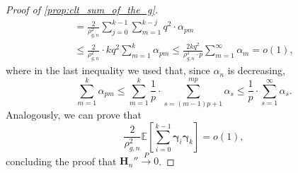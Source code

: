 \documentclass[11pt,a4paper,oneside]{article}
\theoremstyle{definition}
\theoremstyle{remark}
\def\E{\mathbb{E}}
\begin{document}
\begin{proof}[Proof of \cref{prop:clt_sum_of_the_g}]
\begin{multline}
		 =  \frac{2}{\rho_{g,n}^2}  \sum_{j=0}^{k-1} \sum_{m=1}^{k-j} q^2 \cdot \alpha_{pm} \\
		  \leq \frac{2}{\rho_{g,n}^2}\cdot kq^2  \sum_{m=1}^{k}  \alpha_{pm} \leq \frac{2kq^2}{\rho_{g,n}^2\cdot p} \sum_{m=1}^{\infty}  \alpha_{m}= o(1),
	\end{multline}
	where in the last inequality we used that, since $\alpha_n$ is decreasing, 
	\begin{equation}
	 \sum_{m=1}^{k}  \alpha_{pm} \leq  \sum_{m=1}^{k} \frac{1}{p} \cdot \sum_{s=(m-1)p+1}^{mp} \alpha_s  \leq \frac{1}{p}  \cdot \sum_{s=1}^{\infty} \alpha_s.
	\end{equation}
	Analogously, we can prove that 
	\begin{equation}
	 \frac{2}{\rho_{g,n}^2} \E \left[ \sum_{i=0}^{k-1} \bm \gamma_i \bm \gamma_k \right] = o(1),
	\end{equation}
	concluding the proof that $\bm H_n''  \xrightarrow{P} 0$.
	

\end{proof}
\end{document}
